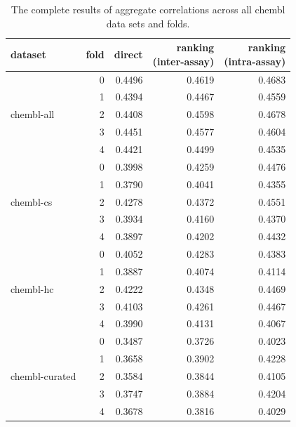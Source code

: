 \begin{table}
\centering
\caption{\label{tab:per-fold-correlations-chembl}The complete results of aggregate correlations across all chembl data sets and folds.}
\begin{tabular}{lrrrr}
\toprule
{dataset} & {fold} & {direct} & \makecell[r]{ranking \\ (\textbf{inter}-assay)} & \makecell[r]{ranking \\ (\textbf{intra}-assay)} \\
\midrule
\multirow[t]{5}{*}{chembl-all} & 0 & 0.4496 & 0.4619 & 0.4683 \\
 & 1 & 0.4394 & 0.4467 & 0.4559 \\
 & 2 & 0.4408 & 0.4598 & 0.4678 \\
 & 3 & 0.4451 & 0.4577 & 0.4604 \\
 & 4 & 0.4421 & 0.4499 & 0.4535 \\
\cline{1-5}
\multirow[t]{5}{*}{chembl-cs} & 0 & 0.3998 & 0.4259 & 0.4476 \\
 & 1 & 0.3790 & 0.4041 & 0.4355 \\
 & 2 & 0.4278 & 0.4372 & 0.4551 \\
 & 3 & 0.3934 & 0.4160 & 0.4370 \\
 & 4 & 0.3897 & 0.4202 & 0.4432 \\
\cline{1-5}
\multirow[t]{5}{*}{chembl-hc} & 0 & 0.4052 & 0.4283 & 0.4383 \\
 & 1 & 0.3887 & 0.4074 & 0.4114 \\
 & 2 & 0.4222 & 0.4348 & 0.4469 \\
 & 3 & 0.4103 & 0.4261 & 0.4467 \\
 & 4 & 0.3990 & 0.4131 & 0.4067 \\
\cline{1-5}
\multirow[t]{5}{*}{chembl-curated} & 0 & 0.3487 & 0.3726 & 0.4023 \\
 & 1 & 0.3658 & 0.3902 & 0.4228 \\
 & 2 & 0.3584 & 0.3844 & 0.4105 \\
 & 3 & 0.3747 & 0.3884 & 0.4204 \\
 & 4 & 0.3678 & 0.3816 & 0.4029 \\
\bottomrule
\end{tabular}
\end{table}
